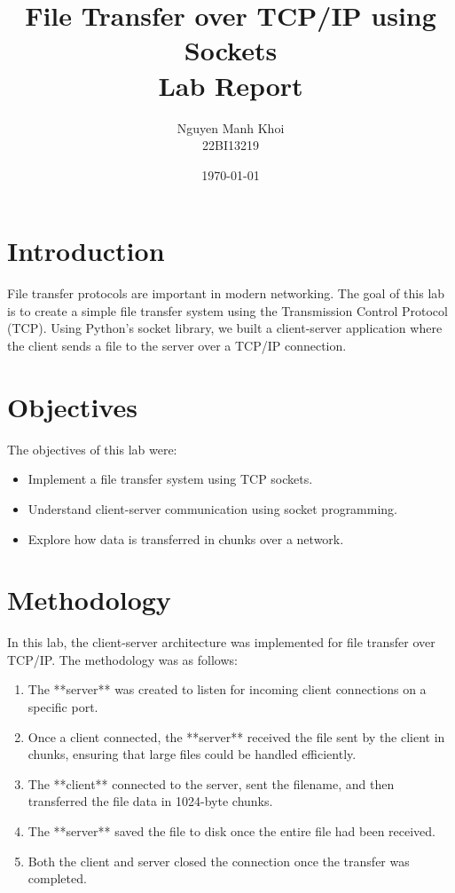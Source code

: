 \documentclass[a4paper,12pt]{article}
\title{File Transfer over TCP/IP using Sockets\\ \large Lab Report}
\author{Nguyen Manh Khoi \\ 22BI13219}
\date{\today}
\begin{document}
\maketitle

\section{Introduction}
File transfer protocols are important in modern networking. The goal of this lab is to create a simple file transfer system using the Transmission Control Protocol (TCP). Using Python’s socket library, we built a client-server application where the client sends a file to the server over a TCP/IP connection.

\section{Objectives}
The objectives of this lab were:
\begin{itemize}
    \item Implement a file transfer system using TCP sockets.
    \item Understand client-server communication using socket programming.
    \item Explore how data is transferred in chunks over a network.
\end{itemize}

\section{Methodology}
In this lab, the client-server architecture was implemented for file transfer over TCP/IP. The methodology was as follows:

\begin{enumerate}
    \item The **server** was created to listen for incoming client connections on a specific port.
    \item Once a client connected, the **server** received the file sent by the client in chunks, ensuring that large files could be handled efficiently.
    \item The **client** connected to the server, sent the filename, and then transferred the file data in 1024-byte chunks.
    \item The **server** saved the file to disk once the entire file had been received.
    \item Both the client and server closed the connection once the transfer was completed.
\end{enumerate}
\end{document}
